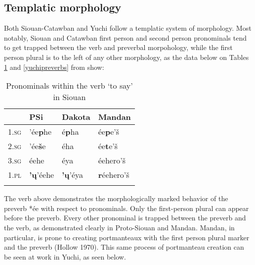 \documentclass[output=paper]{LSP/langsci}
\begin{document}
\subsection{Templatic morphology}

Both Siouan-Catawban and Yuchi follow a templatic system of morphology. Most notably, Siouan and Catawban first person and second person pronominals tend to get trapped between the verb and preverbal morpohology, while the first person plural is to the left of any other morphology, as the data below on Tables \ref{say} and \ref{yuchipreverbs} from \citet{Rankin1998} show:

\begin{table}[h]
\centering
\caption{Pronominals within the verb `to say' in Siouan} \label{say}
    \begin{tabular}{llll}\lsptoprule
    ~          & PSi          & Dakota  & Mandan     \\
  \hline  
    1.\textsc{sg} & '\'ee\textbf{p}he      & \'e\textbf{p}ha       & \'ee\textbf{p}e'\v{s}    \\
    2.\textsc{sg} & '\'ee\textbf{\v{s}}e   & \'eha                 & \'ee\textbf{t}e'\v{s}    \\
    3.\textsc{sg} & \'eehe                 & \'eya                 & \'eehero'\v{s}           \\
    1.\textsc{pl}     & \textbf{'\k{u}}'\'eehe & \textbf{'\k{u}}'\'eya & \textbf{r}\'eehero'\v{s} \\\lspbottomrule
    \end{tabular}
\end{table}

The verb above demonstrates the morphologically marked behavior of the preverb *\'ee with respect to pronominals. Only the first-person plural can appear before the preverb. Every other pronominal is trapped between the preverb and the verb, as demonstrated clearly in Proto-Siouan and Mandan. Mandan, in particular, is prone to creating portmanteaux with the first person plural marker and the preverb (Hollow 1970). This same process of portmanteau creation can be seen at work in Yuchi, as seen below.
\end{document}
